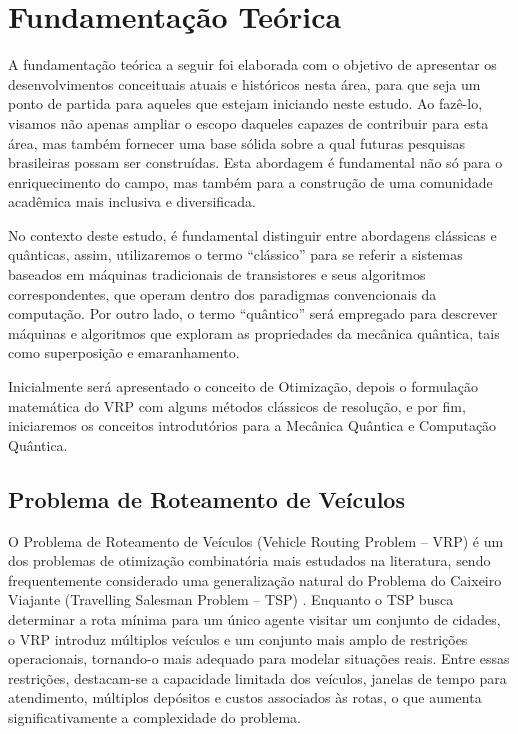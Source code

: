 \chapter{Fundamentação Teórica}

A fundamentação teórica a seguir foi elaborada com o objetivo de apresentar os desenvolvimentos conceituais atuais e históricos nesta área, para que seja um ponto de partida para aqueles que estejam iniciando neste estudo. Ao fazê-lo, visamos não apenas ampliar o escopo daqueles capazes de contribuir para esta área, mas também fornecer uma base sólida sobre a qual futuras pesquisas brasileiras possam ser construídas. Esta abordagem é fundamental não só para o enriquecimento do campo, mas também para a construção de uma comunidade acadêmica mais inclusiva e diversificada.

No contexto deste estudo, é fundamental distinguir entre abordagens clássicas e quânticas, assim, utilizaremos o termo ``clássico'' para se referir a sistemas baseados em máquinas tradicionais de {\red transistores} e seus algoritmos correspondentes, que operam dentro dos paradigmas convencionais da computação. Por outro lado, o termo ``quântico'' será empregado para descrever máquinas e algoritmos que exploram as propriedades da mecânica quântica, tais como superposição e emaranhamento.

Inicialmente será apresentado o conceito de Otimização, depois o formulação matemática do VRP com alguns métodos clássicos de resolução, e por fim, iniciaremos os conceitos introdutórios para a Mecânica Quântica e Computação Quântica.

\section{Problema de Roteamento de Veículos}

O Problema de Roteamento de Veículos (Vehicle Routing Problem – VRP) é um dos problemas de otimização combinatória mais estudados na literatura, sendo frequentemente considerado uma generalização natural do Problema do Caixeiro Viajante (Travelling Salesman Problem – TSP) \cite{gavish1978travelling}. Enquanto o TSP busca determinar a rota mínima para um único agente visitar um conjunto de cidades, o VRP introduz múltiplos veículos e um conjunto mais amplo de restrições operacionais, tornando-o mais adequado para modelar situações reais. Entre essas restrições, destacam-se a capacidade limitada dos veículos, janelas de tempo para atendimento, múltiplos depósitos e custos associados às rotas, o que aumenta significativamente a complexidade do problema.

